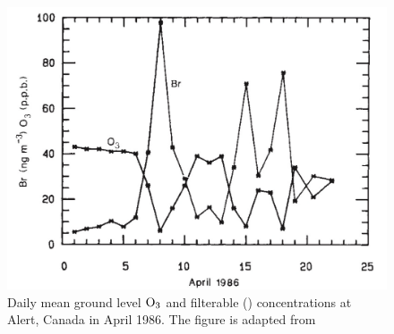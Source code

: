 \begin{figure}[h]
    \centering
    \includegraphics[width =0.8\linewidth]{Appendix/images/Barrie_1988.jpeg}
    \caption{Daily mean ground level $\mathrm{O_3}$ and filterable  () concentrations at Alert, Canada in April 1986. The figure is adapted from \cite{barrie}}
    \label{fig:Barrie_1988}
\end{figure}